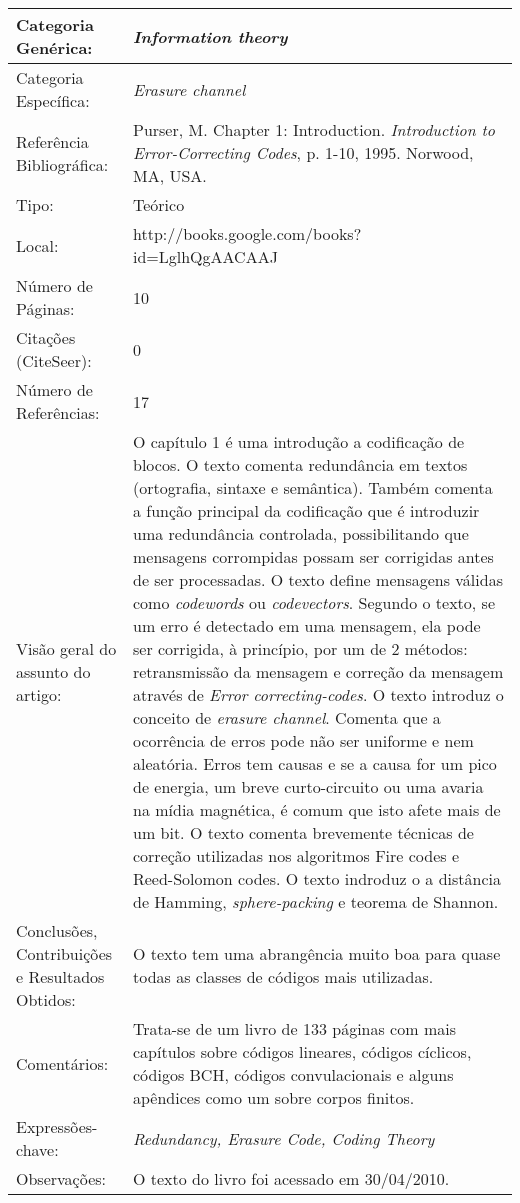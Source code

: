 \documentclass[10pt,a4paper]{article}
\begin{document}
\begin{center}
\begin{tabular}{|p{5cm}||p{10cm}|}
\hline

Categoria Genérica: & \emph{Information theory}\\\hline
Categoria Específica: & \emph{Erasure channel}\\\hline
Referência Bibliográfica: & Purser, M. Chapter 1: Introduction. \emph{Introduction to Error-Correcting Codes}, p. 1-10, 1995. Norwood, MA, USA. \\\hline
Tipo: & Teórico\\\hline
Local: & http://books.google.com/books?id=LglhQgAACAAJ\\\hline
Número de Páginas: & 10\\\hline
Citações (CiteSeer): & 0\\\hline
Número de Referências: & 17\\\hline
Visão geral do assunto do artigo: & O capítulo 1 é uma introdução a codificação de blocos.  O texto comenta redundância em textos (ortografia, sintaxe e semântica). Também comenta a função principal da codificação que é introduzir uma redundância controlada, possibilitando que mensagens corrompidas possam ser corrigidas antes de ser processadas. O texto define mensagens válidas como \emph{codewords} ou \emph{codevectors}. Segundo o texto, se um erro é detectado em uma mensagem, ela pode ser corrigida, à princípio, por um de 2 métodos: retransmissão da mensagem e correção da mensagem através de \emph{Error correcting-codes}. O texto introduz o conceito de \emph{erasure channel}. Comenta que a ocorrência de erros pode não ser uniforme e nem aleatória. Erros tem causas e se a causa for um pico de energia, um breve curto-circuito ou uma avaria na mídia magnética, é comum que isto afete mais de um bit. O texto comenta brevemente técnicas de correção utilizadas nos algoritmos Fire codes e Reed-Solomon codes. O texto indroduz o a distância de Hamming, \emph{sphere-packing} e teorema de Shannon.\\\hline
Conclusões, Contribuições e Resultados Obtidos: &  O texto tem uma abrangência muito boa para quase todas as classes de códigos mais utilizadas. \\\hline
Comentários: & Trata-se de um livro de 133 páginas com mais capítulos sobre códigos lineares, códigos cíclicos, códigos BCH, códigos convulacionais e alguns apêndices como um sobre corpos finitos.\\\hline
Expressões-chave: & \emph{Redundancy, Erasure Code, Coding Theory}\\\hline
Observações: &  O texto do livro foi acessado em 30/04/2010.\\\hline

\end{tabular}
\end{center}
\end{document}
